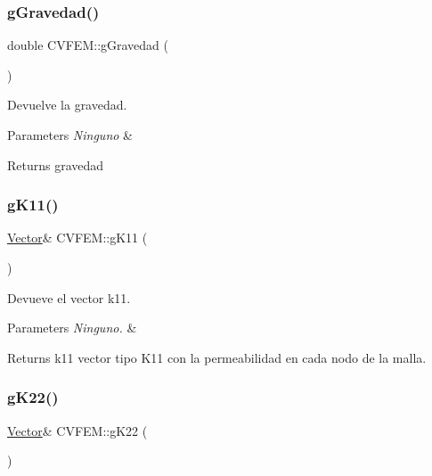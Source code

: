 \subsubsection{\texorpdfstring{g\+Gravedad()}{gGravedad()}}
{\footnotesize\ttfamily double C\+V\+F\+E\+M\+::g\+Gravedad (\begin{DoxyParamCaption}{ }\end{DoxyParamCaption})\hspace{0.3cm}{\ttfamily [inline]}}



Devuelve la gravedad. 


\begin{DoxyParams}{Parameters}
{\em Ninguno} & \\
\hline
\end{DoxyParams}
\begin{DoxyReturn}{Returns}
gravedad 
\end{DoxyReturn}
\hypertarget{class_c_v_f_e_m_a8e29f1e40b135cee648e08fc151744c7}{}\label{class_c_v_f_e_m_a8e29f1e40b135cee648e08fc151744c7} 
\subsubsection{\texorpdfstring{g\+K11()}{gK11()}}
{\footnotesize\ttfamily \hyperlink{class_vector}{Vector}\& C\+V\+F\+E\+M\+::g\+K11 (\begin{DoxyParamCaption}{ }\end{DoxyParamCaption})\hspace{0.3cm}{\ttfamily [inline]}}



Devueve el vector k11. 


\begin{DoxyParams}{Parameters}
{\em Ninguno.} & \\
\hline
\end{DoxyParams}
\begin{DoxyReturn}{Returns}
k11 vector tipo K11 con la permeabilidad en cada nodo de la malla. 
\end{DoxyReturn}
\hypertarget{class_c_v_f_e_m_af819a87944fdb7f338182ed8b92aaac6}{}\label{class_c_v_f_e_m_af819a87944fdb7f338182ed8b92aaac6} 
\subsubsection{\texorpdfstring{g\+K22()}{gK22()}}
{\footnotesize\ttfamily \hyperlink{class_vector}{Vector}\& C\+V\+F\+E\+M\+::g\+K22 (\begin{DoxyParamCaption}{ }\end{DoxyParamCaption})\hspace{0.3cm}{\ttfamily [inline]}}



